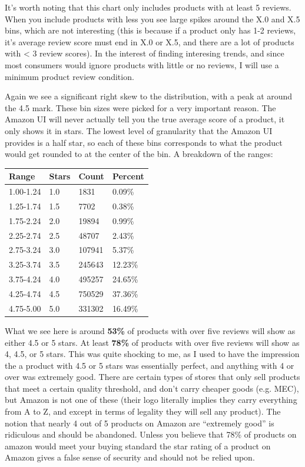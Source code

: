 \documentclass[a4paper,10pt]{article}
\begin{document}
It's worth noting that this chart only includes products with at least 5 reviews. When you include products with less you see large spikes around the X.0 and X.5 bins, which are not interesting (this is because if a product only has 1-2 reviews, it's average review score must end in X.0 or X.5, and there are a lot of products with < 3 review scores). In the interest of finding interesing trends, and since most consumers would ignore products with little or no reviews, I will use a minimum product review condition.

Again we see a significant right skew to the distribution, with a peak at around the 4.5 mark. These bin sizes were picked for a very important reason. The Amazon UI will never actually tell you the true average score of a product, it only shows it in stars. The lowest level of granularity that the Amazon UI provides is a half star, so each of these bins corresponds to what the product would get rounded to at the center of the bin. A breakdown of the ranges:

\begin{center}
    \begin{tabular}{l l l l}
    \textbf{Range} & \textbf{Stars} & \textbf{Count} & \textbf{Percent} \\
    \hline
    1.00-1.24 & 1.0 & 1831      & 0.09\% \\
    1.25-1.74 & 1.5 & 7702      & 0.38\% \\
    1.75-2.24 & 2.0 & 19894     & 0.99\% \\
    2.25-2.74 & 2.5 & 48707     & 2.43\% \\
    2.75-3.24 & 3.0 & 107941    & 5.37\% \\
    3.25-3.74 & 3.5 & 245643    & 12.23\% \\
    3.75-4.24 & 4.0 & 495257    & 24.65\% \\
    4.25-4.74 & 4.5 & 750529    & 37.36\% \\
    4.75-5.00 & 5.0 & 331302    & 16.49\% \\
    \end{tabular}
\end{center}
What we see here is around \textbf{53\%} of products with over five reviews will show as either 4.5 or 5 stars. At least \textbf{78\%} of products with over five reviews will show as 4, 4.5, or 5 stars. This was quite shocking to me, as I used to have the impression the a product with 4.5 or 5 stars was essentially perfect, and anything with 4 or over was extremely good. There are certain types of stores that only sell products that meet a certain quality threshold, and don't carry cheaper goods (e.g. MEC), but Amazon is not one of these (their logo literally implies they carry everything from A to Z, and except in terms of legality they will sell any product). The notion that nearly 4 out of 5 products on Amazon are \enquote{extremely good} is ridiculous and should be abandoned. Unless you believe that 78\% of products on amazon would meet your buying standard the star rating of a product on Amazon gives a false sense of security and should not be relied upon.
\end{document}
